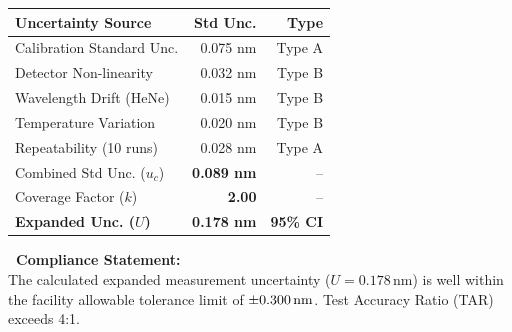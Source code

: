 \documentclass[10pt,a4paper]{scrartcl}
\begin{document}
\begin{tcolorbox}[sectionbox, title={\faChartBar\ SECTION 5: 200mm WAFER UNIFORMITY MAP \& UNCERTAINTY BUDGET}]
\begin{minipage}[t]{0.46\textwidth}
  \small
  \begin{tabularx}{\textwidth}{@{}X r r@{}}
    \toprule
    \textbf{Uncertainty Source} & \textbf{Std Unc.} & \textbf{Type} \\
    \midrule
    \rowcolor{TableAlt}
    Calibration Standard Unc. & 0.075 nm & Type A \\
    Detector Non-linearity & 0.032 nm & Type B \\
    \rowcolor{TableAlt}
    Wavelength Drift (HeNe) & 0.015 nm & Type B \\
    Temperature Variation & 0.020 nm & Type B \\
    \rowcolor{TableAlt}
    Repeatability (10 runs) & 0.028 nm & Type A \\
    \midrule
    Combined Std Unc. ($u_c$) & \textbf{0.089 nm} & -- \\
    \rowcolor{TableAlt}
    Coverage Factor ($k$) & \textbf{2.00} & -- \\
    \textbf{Expanded Unc. ($U$)} & \textbf{\textpm{} 0.178 nm} & \textbf{95\% CI} \\
    \bottomrule
  \end{tabularx}

  \vspace{4pt}
  \begin{tcolorbox}[colback=white, colframe=CleanroomBlue, boxrule=0.5pt, arc=2pt, left=4pt, right=4pt, top=3pt, bottom=3pt]
    \scriptsize \textcolor{NavyDark}{\textbf{\faInfoCircle\ Compliance Statement:}}\\
    The calculated expanded measurement uncertainty ($U = 0.178\,\text{nm}$) is well within the facility allowable tolerance limit of $\text{\textpm} 0.300\,\text{nm}$. Test Accuracy Ratio (TAR) exceeds 4:1.
  \end{tcolorbox}
\end{minipage}
\end{tcolorbox}

\vspace{1pt}
\end{document}
